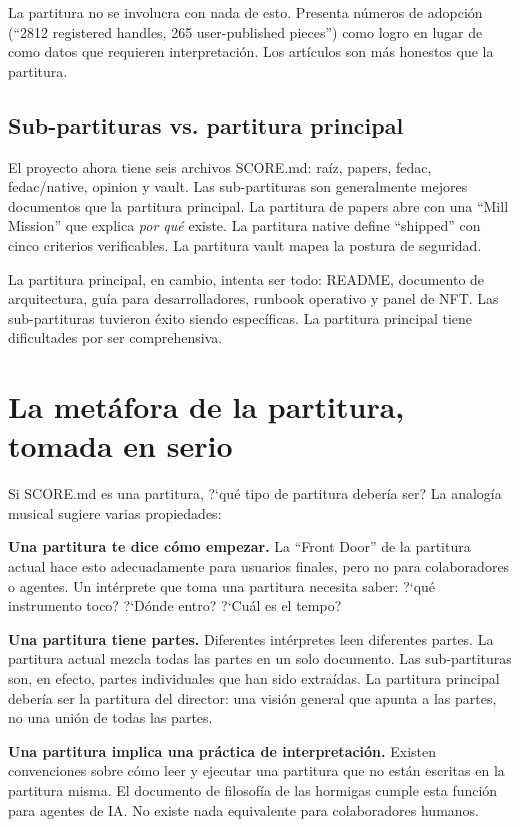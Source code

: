 \documentclass[10pt,letterpaper,twocolumn]{article}
\begin{document}
La partitura no se involucra con nada de esto. Presenta n\'umeros de adopci\'on (``2812 registered handles, 265 user-published pieces'') como logro en lugar de como datos que requieren interpretaci\'on. Los art\'iculos son m\'as honestos que la partitura.

\subsection{Sub-partituras vs. partitura principal}

El proyecto ahora tiene seis archivos SCORE.md: ra\'iz, papers, fedac, fedac/native, opinion y vault. Las sub-partituras son generalmente mejores documentos que la partitura principal. La partitura de papers abre con una ``Mill Mission'' que explica \emph{por qu\'e} existe. La partitura native define ``shipped'' con cinco criterios verificables. La partitura vault mapea la postura de seguridad.

La partitura principal, en cambio, intenta ser todo: README, documento de arquitectura, gu\'ia para desarrolladores, runbook operativo y panel de NFT. Las sub-partituras tuvieron \'exito siendo espec\'ificas. La partitura principal tiene dificultades por ser comprehensiva.

\section{La met\'afora de la partitura, tomada en serio}

Si SCORE.md es una partitura, ?`qu\'e tipo de partitura deber\'ia ser? La analog\'ia musical sugiere varias propiedades:

\textbf{Una partitura te dice c\'omo empezar.} La ``Front Door'' de la partitura actual hace esto adecuadamente para usuarios finales, pero no para colaboradores o agentes. Un int\'erprete que toma una partitura necesita saber: ?`qu\'e instrumento toco? ?`D\'onde entro? ?`Cu\'al es el tempo?

\textbf{Una partitura tiene partes.} Diferentes int\'erpretes leen diferentes partes. La partitura actual mezcla todas las partes en un solo documento. Las sub-partituras son, en efecto, partes individuales que han sido extra\'idas. La partitura principal deber\'ia ser la partitura del director: una visi\'on general que apunta a las partes, no una uni\'on de todas las partes.

\textbf{Una partitura implica una pr\'actica de interpretaci\'on.} Existen convenciones sobre c\'omo leer y ejecutar una partitura que no est\'an escritas en la partitura misma. El documento de filosof\'ia de las hormigas cumple esta funci\'on para agentes de IA. No existe nada equivalente para colaboradores humanos.
\end{document}
